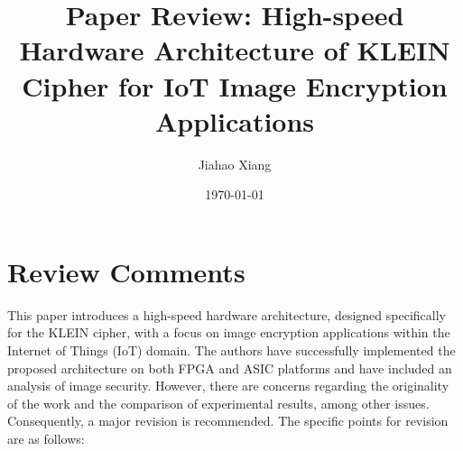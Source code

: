 \documentclass{article}
\title{Paper Review: High-speed Hardware Architecture of KLEIN Cipher for IoT Image Encryption Applications}
\author{Jiahao Xiang}
\date{\today}
\begin{document}
\maketitle

\section{Review Comments}

This paper introduces a high-speed hardware architecture, designed specifically for the KLEIN cipher, with a focus on image encryption applications within the Internet of Things (IoT) domain. The authors have successfully implemented the proposed architecture on both FPGA and ASIC platforms and have included an analysis of image security. However, there are concerns regarding the originality of the work and the comparison of experimental results, among other issues. Consequently, a major revision is recommended. The specific points for revision are as follows:
\end{document}
